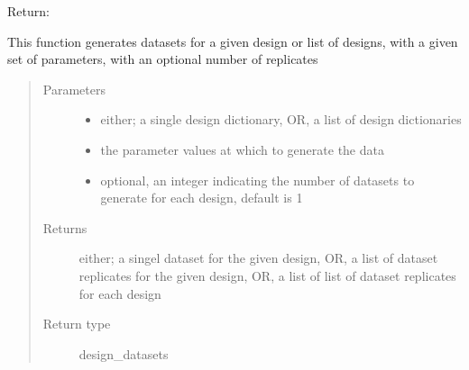 \documentclass[letterpaper,10pt,english]{sphinxmanual}
\begin{document}
\begin{fulllineitems}
\begin{fulllineitems}
Return:

\end{fulllineitems}


\begin{fulllineitems}
\label{\detokenize{nloed:nloed.model.Model.sample}}
This function generates datasets for a given design or list of designs,
with a given set of parameters,  with an optional number of replicates
\begin{quote}\begin{description}
\item[{Parameters}] \leavevmode\begin{itemize}
\item {} 
 \textendash{} either; a single design dictionary,  OR,  a list of design dictionaries

\item {} 
 \textendash{} the parameter values at which to generate the data

\item {} 
 \textendash{} optional,  an integer indicating the number of datasets to generate for each design,  default is 1

\end{itemize}

\item[{Returns}] \leavevmode
either; a singel dataset for the given design,  OR,  a list of dataset replicates for the given design,  OR,  a list of list of dataset replicates for each design

\item[{Return type}] \leavevmode
design\_datasets

\end{description}\end{quote}

\end{fulllineitems}


\end{fulllineitems}
\end{document}
